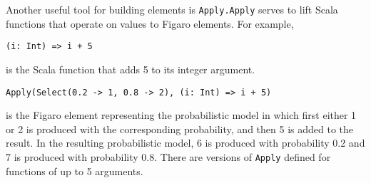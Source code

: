 Another useful tool for building elements is \texttt{Apply.Apply} serves to lift Scala functions that operate on values to Figaro elements. For example,

\begin{flushleft}
\texttt{(i: Int) => i + 5}
\end{flushleft}

is the Scala function that adds 5 to its integer argument.

\begin{flushleft}
\texttt{Apply(Select(0.2 -> 1, 0.8 -> 2), (i: Int) => i + 5)}
\end{flushleft}

is the Figaro element representing the probabilistic model in which first either 1 or 2 is produced with the corresponding probability, and then 5 is added to the result. In the resulting probabilistic model, 6 is produced with probability 0.2 and 7 is produced with probability 0.8. There are versions of \texttt{Apply} defined for functions of up to 5 arguments. 






